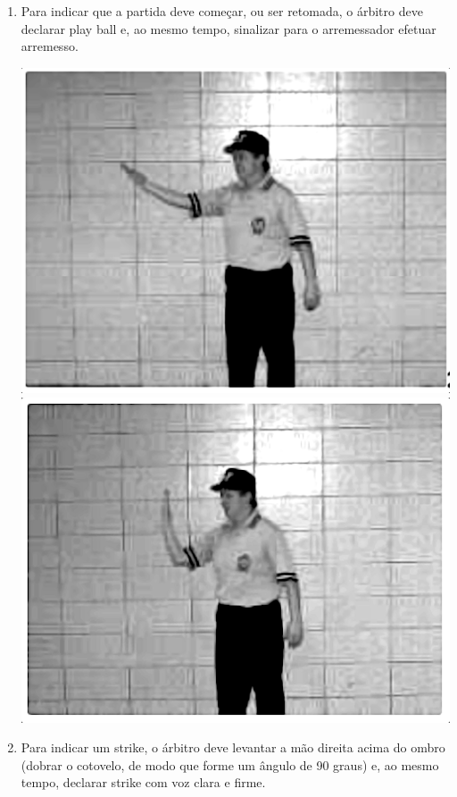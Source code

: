 \begin{enumerate}[label=(\alph*)]
	\item  Para indicar que a partida deve começar, ou ser retomada, o árbitro deve declarar \gls{play ball} e, ao mesmo tempo, sinalizar para o arremessador efetuar arremesso.

	\includegraphics[height=.20\textheight]{fig/sinais/playball-1}
	\includegraphics[height=.20\textheight]{fig/sinais/playball-2}

	\item Para indicar um \gls{strike}, o árbitro deve levantar a mão direita acima do ombro (dobrar o cotovelo, de modo que forme um ângulo de 90 graus) e, ao mesmo tempo, declarar \gls{strike} com voz clara e firme.


\end{enumerate}
